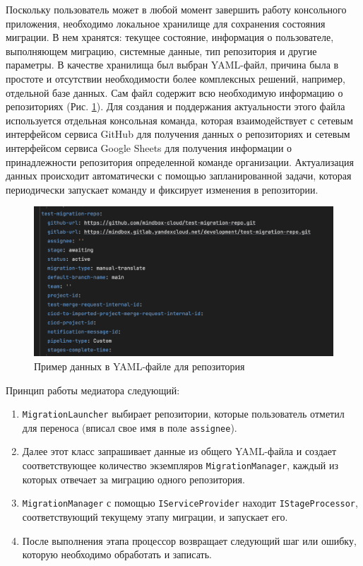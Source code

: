 Поскольку пользователь может в любой момент завершить работу консольного приложения, необходимо локальное хранилище для сохранения состояния миграции.
В нем хранятся: текущее состояние, информация о пользователе, выполняющем миграцию, системные данные, тип репозитория и другие параметры.
В качестве хранилища был выбран YAML-файл, причина была в простоте и отсутствии необходимости более комплексных решений, например, отдельной базе данных.
Сам файл содержит всю необходимую информацию о репозиториях (Рис. \ref{fig:migration-state-file}).
Для создания и поддержания актуальности этого файла используется отдельная консольная команда, которая взаимодействует с сетевым интерфейсом сервиса GitHub для получения данных о репозиториях и сетевым интерфейсом сервиса Google Sheets для получения информации о принадлежности репозитория определенной команде организации.
Актуализация данных происходит автоматически с помощью запланированной задачи, которая периодически запускает команду и фиксирует изменения в репозитории.

\begin{figure}[H]
  \centering
  \includegraphics[width=12cm]{img/migration-state-file}
  \caption{Пример данных в YAML-файле для репозитория}
  \label{fig:migration-state-file}
\end{figure}

Принцип работы медиатора следующий:
\begin{enumerate}
  \item \texttt{MigrationLauncher} выбирает репозитории, которые пользователь отметил для переноса (вписал свое имя в поле \texttt{assignee}).
  \item Далее этот класс запрашивает данные из общего YAML-файла и создает соответствующее количество экземпляров \texttt{MigrationManager},
        каждый из которых отвечает за миграцию одного репозитория.
  \item \texttt{MigrationManager} с помощью \texttt{IServiceProvider} находит \texttt{IStageProcessor},
        соответствующий текущему этапу миграции, и запускает его.
  \item После выполнения этапа процессор возвращает следующий шаг или ошибку, которую необходимо обработать и записать.
\end{enumerate}

